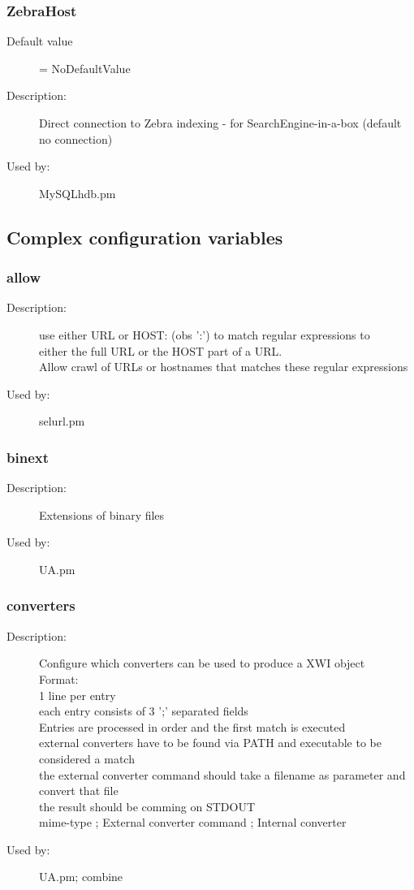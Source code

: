 \subsubsection{ZebraHost}
\label{ZebraHost}
\begin{description}
\item[Default value] = NoDefaultValue
\item[Description:] Direct connection to Zebra indexing - for SearchEngine-in-a-box (default no connection)
\item[Used by:] MySQLhdb.pm
\end{description}
\subsection{Complex configuration variables}
\subsubsection{allow}
\label{allow}
\begin{description}
\item[Description:] use either URL or HOST: (obs ':') to match regular expressions to \\  either the full URL or the HOST part of a URL. \\ Allow crawl of URLs or hostnames that matches these regular expressions
\item[Used by:] selurl.pm
\end{description}
\subsubsection{binext}
\label{binext}
\begin{description}
\item[Description:] Extensions of binary files
\item[Used by:] UA.pm
\end{description}
\subsubsection{converters}
\label{converters}
\begin{description}
\item[Description:] Configure which converters can be used to produce a XWI object \\ Format: \\   1 line per entry \\   each entry consists of 3 ';' separated fields \\ Entries are processed in order and the first match is executed \\   external converters have to be found via PATH and executable to be considered a match \\   the external converter command should take a filename as parameter and convert that file \\    the result should be comming on STDOUT \\  mime-type   ;   External converter command ; Internal converter
\item[Used by:] UA.pm; combine
\end{description}
